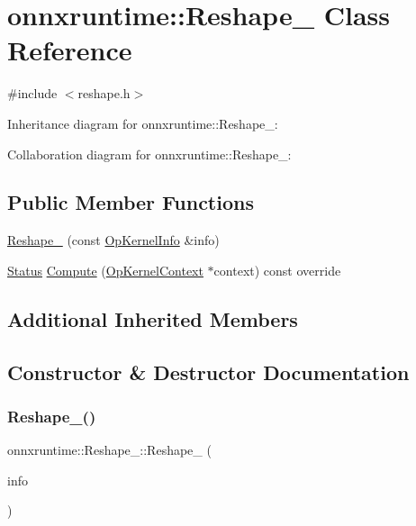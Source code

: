 \hypertarget{classonnxruntime_1_1Reshape__1}{}\section{onnxruntime\+:\+:Reshape\+\_ Class Reference}
\label{classonnxruntime_1_1Reshape__1}


{\ttfamily \#include $<$reshape.\+h$>$}



Inheritance diagram for onnxruntime\+:\+:Reshape\+\_\+:


Collaboration diagram for onnxruntime\+:\+:Reshape\+\_\+:
\subsection*{Public Member Functions}
\begin{DoxyCompactItemize}
\item 
\mbox{\hyperlink{classonnxruntime_1_1Reshape__1_a5d0e44f051fa3a23172fb69aaf09e05a}{Reshape\+\_}} (const \mbox{\hyperlink{classonnxruntime_1_1OpKernelInfo}{Op\+Kernel\+Info}} \&info)
\item 
\mbox{\hyperlink{classonnxruntime_1_1common_1_1Status}{Status}} \mbox{\hyperlink{classonnxruntime_1_1Reshape__1_a48c62e63b3da7509b5bb5601b31b47fa}{Compute}} (\mbox{\hyperlink{classonnxruntime_1_1OpKernelContext}{Op\+Kernel\+Context}} $\ast$context) const override
\end{DoxyCompactItemize}
\subsection*{Additional Inherited Members}


\subsection{Constructor \& Destructor Documentation}
\mbox{\label{classonnxruntime_1_1Reshape__1_a5d0e44f051fa3a23172fb69aaf09e05a}} 
\subsubsection{\texorpdfstring{Reshape\+\_()}{Reshape\_1()}}
{\footnotesize\ttfamily onnxruntime\+::\+Reshape\+\_\+::\+Reshape\+\_ (\begin{DoxyParamCaption}\item[{const \mbox{\hyperlink{classonnxruntime_1_1OpKernelInfo}{Op\+Kernel\+Info}} \&}]{info }\end{DoxyParamCaption})\hspace{0.3cm}{\ttfamily [inline]}}



